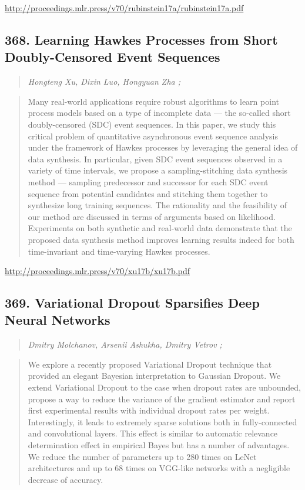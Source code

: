 \documentclass{article}
\begin{document}
\href{http://proceedings.mlr.press/v70/rubinstein17a/rubinstein17a.pdf}{http://proceedings.mlr.press/v70/rubinstein17a/rubinstein17a.pdf}

\subsection{368. Learning Hawkes Processes from Short Doubly-Censored Event Sequences}

\begin{quote}
\footnotesize{\textit{Hongteng Xu, Dixin Luo, Hongyuan Zha ;}}
\end{quote}

\begin{quote}
    Many real-world applications require robust algorithms to learn point process models based on a type of incomplete data — the so-called short doubly-censored (SDC) event sequences. In this paper, we study this critical problem of quantitative asynchronous event sequence analysis under the framework of Hawkes processes by leveraging the general idea of data synthesis. In particular, given SDC event sequences observed in a variety of time intervals, we propose a sampling-stitching data synthesis method — sampling predecessor and successor for each SDC event sequence from potential candidates and stitching them together to synthesize long training sequences. The rationality and the feasibility of our method are discussed in terms of arguments based on likelihood. Experiments on both synthetic and real-world data demonstrate that the proposed data synthesis method improves learning results indeed for both time-invariant and time-varying Hawkes processes.  \end{quote}

\href{http://proceedings.mlr.press/v70/xu17b/xu17b.pdf}{http://proceedings.mlr.press/v70/xu17b/xu17b.pdf}

\subsection{369. Variational Dropout Sparsifies Deep Neural Networks}

\begin{quote}
\footnotesize{\textit{Dmitry Molchanov, Arsenii Ashukha, Dmitry Vetrov ;}}
\end{quote}

\begin{quote}
    We explore a recently proposed Variational Dropout technique that provided an elegant Bayesian interpretation to Gaussian Dropout. We extend Variational Dropout to the case when dropout rates are unbounded, propose a way to reduce the variance of the gradient estimator and report first experimental results with individual dropout rates per weight. Interestingly, it leads to extremely sparse solutions both in fully-connected and convolutional layers. This effect is similar to automatic relevance determination effect in empirical Bayes but has a number of advantages. We reduce the number of parameters up to 280 times on LeNet architectures and up to 68 times on VGG-like networks with a negligible decrease of accuracy.  \end{quote}
\end{document}
